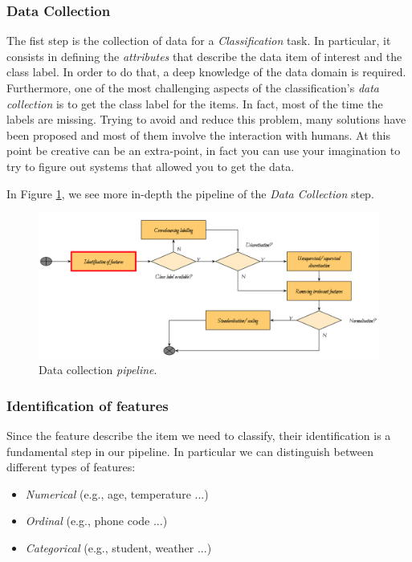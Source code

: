 \subsubsection{Data Collection}

The fist step is the collection of data for a \emph{Classification} task. In particular, it consists in defining the \emph{attributes} that describe the data item of interest and the class label. In order to do that, a deep knowledge of the data domain is required. Furthermore, one of the most challenging aspects of the classification's \emph{data collection} is to get the class label for the items. In fact, most of the time the labels are missing. Trying to avoid and reduce this problem, many solutions have been proposed and most of them involve the interaction with humans. At this point be creative can be an extra-point, in fact you can use your imagination to try to figure out systems that allowed you to get the data.

In Figure \ref{pic:data_collection_pipeline}, we see more in-depth the pipeline of the \emph{Data Collection} step. 

\begin{figure}[H]%
 \centering
 \includegraphics[width=13cm]{./img/08/data_collection_pipeline}
 \caption{\label{pic:data_collection_pipeline} Data collection \emph{pipeline}.}
\end{figure}

\subsubsection*{Identification of features}

Since the feature describe the item we need to classify, their identification is a fundamental step in our pipeline. In particular we can distinguish between different types of features:
\begin{itemize}
\item \emph{Numerical} (e.g., age, temperature ...)
\item \emph{Ordinal} (e.g., phone code ...)
\item \emph{Categorical} (e.g., student, weather ...)
\end{itemize}


